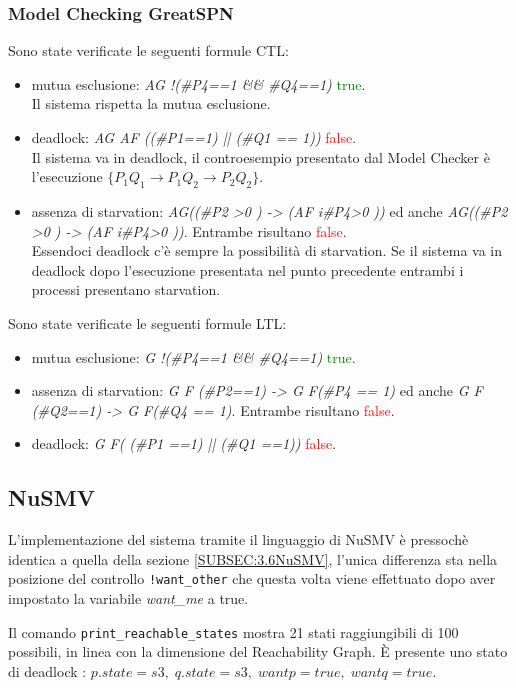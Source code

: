 \documentclass[a4paper]{article}
\begin{document}
\subsubsection{Model Checking GreatSPN}
Sono state verificate le seguenti formule CTL:
\begin{itemize}
	\item mutua esclusione: \textit{AG !(\#P4==1 \&\& \#Q4==1)} \textcolor{green}{true}.\\
		Il sistema rispetta la mutua esclusione.
	\item deadlock: \textit{AG AF ((\#P1==1) || (\#Q1 == 1))} \textcolor{red}{false}.\\
		Il sistema va in deadlock, il controesempio presentato dal Model Checker è l'esecuzione $\{P_1Q_1 \rightarrow P_1Q_2 \rightarrow P_2Q_2\}$.
	\item assenza di starvation: \textit{AG((\#P2 >0 ) -> (AF i\#P4>0 ))} ed anche \textit{AG((\#P2 >0 ) -> (AF i\#P4>0 ))}. Entrambe risultano \textcolor{red}{false}.\\
		Essendoci deadlock c'è sempre la possibilità di starvation. Se il sistema va in deadlock dopo l'esecuzione presentata nel punto precedente entrambi i processi presentano starvation.
\end{itemize}
Sono state verificate le seguenti formule LTL:
\begin{itemize}
	\item mutua esclusione: \textit{G !(\#P4==1 \&\& \#Q4==1)} \textcolor{green}{true}.
	\item assenza di starvation: \textit{G F (\#P2==1) -> G F(\#P4 == 1)} ed anche \textit{G F (\#Q2==1) -> G F(\#Q4 == 1)}. Entrambe risultano \textcolor{red}{false}.
	\item deadlock: \textit{G F( (\#P1 ==1) ||  (\#Q1 ==1))} \textcolor{red}{false}.
\end{itemize}
\newpage
\subsection{NuSMV}
L'implementazione del sistema tramite il linguaggio di NuSMV è pressochè identica a quella della sezione \ref{SUBSEC:3.6NuSMV}, l'unica differenza sta nella posizione del controllo \texttt{!want\_other} che questa volta viene effettuato dopo aver impostato la variabile \textit{want\_me} a true.

Il comando \texttt{print\_reachable\_states} mostra 21 stati raggiungibili di 100 possibili, in linea con la dimensione del Reachability Graph.
È presente uno stato di deadlock : $p.state=s3, \; q.state=s3, \; wantp = true, \; wantq = true $. 
\end{document}
